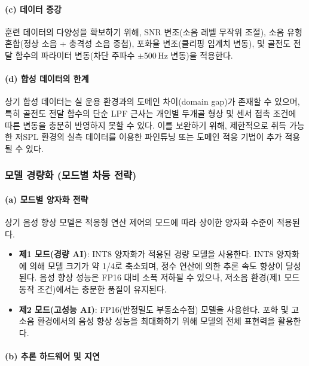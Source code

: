 \documentclass{article}
\begin{document}
\paragraph{(c) 데이터 증강}

훈련 데이터의 다양성을 확보하기 위해, SNR 변조(소음 레벨 무작위 조절), 소음 유형 혼합(정상 소음 + 충격성 소음 중첩), 포화율 변조(클리핑 임계치 변동), 및 골전도 전달 함수의 파라미터 변동(차단 주파수 $\pm$500\,Hz 변동)을 적용한다.

\paragraph{(d) 합성 데이터의 한계}

상기 합성 데이터는 실 운용 환경과의 도메인 차이(domain gap)가 존재할 수 있으며, 특히 골전도 전달 함수의 단순 LPF 근사는 개인별 두개골 형상 및 센서 접촉 조건에 따른 변동을 충분히 반영하지 못할 수 있다. 이를 보완하기 위해, 제한적으로 취득 가능한 저SPL 환경의 실측 데이터를 이용한 파인튜닝 또는 도메인 적응 기법이 추가 적용될 수 있다.

\subsubsection{모델 경량화 (모드별 차등 전략)}

\paragraph{(a) 모드별 양자화 전략}

상기 음성 향상 모델은 적응형 연산 제어의 모드에 따라 상이한 양자화 수준이 적용된다.

\begin{itemize}
    \item \textbf{제1 모드(경량 AI)}: INT8 양자화가 적용된 경량 모델을 사용한다. INT8 양자화에 의해 모델 크기가 약 1/4로 축소되며, 정수 연산에 의한 추론 속도 향상이 달성된다. 음성 향상 성능은 FP16 대비 소폭 저하될 수 있으나, 저소음 환경(제1 모드 동작 조건)에서는 충분한 품질이 유지된다.
    \item \textbf{제2 모드(고성능 AI)}: FP16(반정밀도 부동소수점) 모델을 사용한다. 포화 및 고소음 환경에서의 음성 향상 성능을 최대화하기 위해 모델의 전체 표현력을 활용한다.
\end{itemize}

\paragraph{(b) 추론 하드웨어 및 지연}
\end{document}
